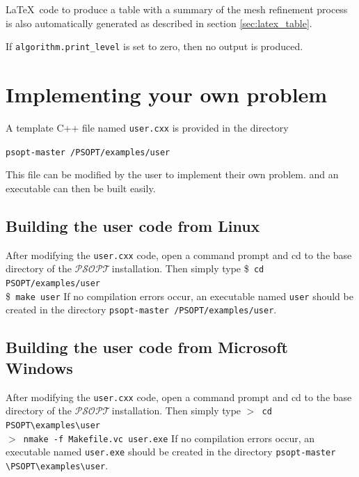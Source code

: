 \documentclass[a4paper,11pt]{report}    %
\newcommand{\psopt}{$\mathcal{PSOPT}$\,}  %
\newcommand{\basedir}{\texttt{psopt-master\,}}
\newenvironment{shadedframe}{%
  \def\FrameCommand{\fcolorbox{black}{shadecolor}}%
  \MakeFramed {\FrameRestore}}
{\endMakeFramed}
\begin{document}
\LaTeX \, code to produce a table with a summary of the mesh refinement process is also automatically generated  as described in section \ref{sec:latex_table}.

If \verb|algorithm.print_level| is set to zero, then no output is produced.



\section{Implementing your own problem}

A template C++ file named \texttt{user.cxx} is provided in the directory 

\begin{center}
\texttt{\basedir/PSOPT/examples/user}
\end{center}

This file can be modified by the user to implement their own problem. and an executable can then be built easily.

\subsection{Building the user code from Linux}

After modifying the \texttt{user.cxx} code, open a command prompt and cd to the base directory of the \psopt installation.
Then simply type
\begin{shadedframe}
\noindent \$\verb| cd PSOPT/examples/user|\\
\$\verb| make user|
\end{shadedframe}
If no compilation errors occur, an executable named \texttt{user} should be created in the directory \basedir\verb|/PSOPT/examples/user|.

\subsection{Building the user code from Microsoft Windows}

After modifying the \texttt{user.cxx} code, open a command prompt and cd to the base directory of the \psopt installation.
Then simply type
\begin{shadedframe}
\noindent $>$\verb| cd PSOPT\examples\user|\\
$>$\verb| nmake -f Makefile.vc user.exe|
\end{shadedframe}
If no compilation errors occur, an executable named \texttt{user.exe} should be created in the directory \basedir\verb|\PSOPT\examples\user|.
\end{document}

